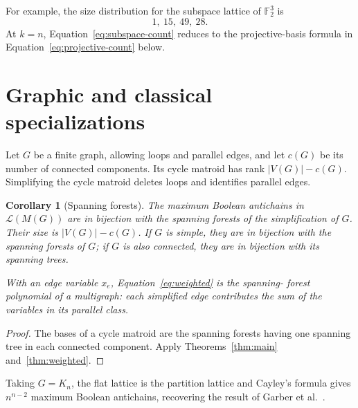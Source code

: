 \documentclass[11pt]{article}
\newtheorem{corollary}[theorem]{Corollary}
\theoremstyle{definition}
\theoremstyle{remark}
\newcommand{\cL}{\mathcal L}
\begin{document}
For example, the size distribution for the subspace lattice of
$\mathbb F_2^3$ is
\[
 1,\ 15,\ 49,\ 28.
\]
At $k=n$, Equation~\eqref{eq:subspace-count} reduces to the projective-basis
formula in Equation~\eqref{eq:projective-count} below.

\section{Graphic and classical specializations}

Let $G$ be a finite graph, allowing loops and parallel edges, and let $c(G)$
be its number of connected components.  Its cycle matroid has rank
$|V(G)|-c(G)$.  Simplifying the cycle matroid deletes loops and identifies
parallel edges.

\begin{corollary}[Spanning forests]\label{cor:graphic}
The maximum Boolean antichains in $\cL(M(G))$ are in bijection with the
spanning forests of the simplification of $G$.
Their size is
$|V(G)|-c(G)$.  If $G$ is simple, they are in bijection with the spanning
forests of $G$; if $G$ is also connected, they are in bijection with its
spanning trees.

With an edge variable $x_e$, Equation~\eqref{eq:weighted} is the spanning-
forest polynomial of a multigraph: each simplified edge contributes the sum
of the variables in its parallel class.
\end{corollary}

\begin{proof}
The bases of a cycle matroid are the spanning forests having one spanning
tree in each connected component.  Apply Theorems~\ref{thm:main}
and~\ref{thm:weighted}.
\end{proof}

Taking $G=K_n$, the flat lattice is the partition lattice and Cayley's formula
gives $n^{n-2}$ maximum Boolean antichains, recovering the result of
Garber et al.\ \cite{GarberEtAl2026}.
\end{document}
